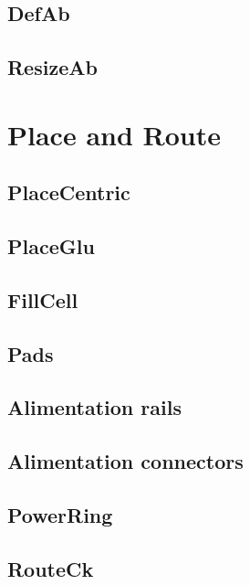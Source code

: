 \documentclass[12pt]{article}
\begin{document}
    \subsection{DefAb}
    \label{secdefab}
    
    \subsection{ResizeAb}
    \label{secresizeab}
    
    
\newpage
\section{Place and Route}
\label{secroute}

    \subsection{PlaceCentric}
    \label{seccentric}
    
    \subsection{PlaceGlu}
    \label{secglu}
    
    \subsection{FillCell}
    \label{secfillcell}
    
    \subsection{Pads}
    \label{secpads}
    
    \subsection{Alimentation rails}
    \label{secrails}
    
    \subsection{Alimentation connectors}
    \label{secconnectors}
    
    \subsection{PowerRing}
    \label{secpowerring}
    
    \subsection{RouteCk}
    \label{secrouteck}
    
\end{document}
